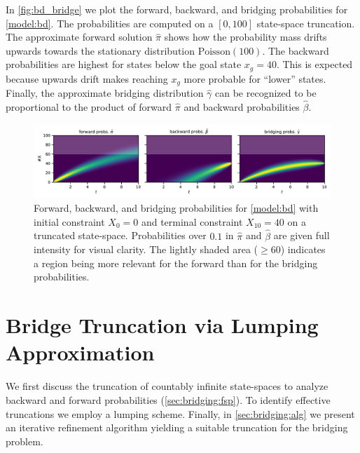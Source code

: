 \begin{example}
In \autoref{fig:bd_bridge} we plot the forward, backward, and bridging probabilities for \autoref{model:bd}.
The probabilities are computed on a $[0,100]$ state-space truncation.
The approximate forward solution $\hat\pi$ shows how the probability mass drifts upwards towards the stationary distribution $\text{Poisson}(100)$. The backward probabilities are highest for states below the goal state $x_g=40$.
This is expected because upwards drift makes reaching $x_g$ more probable for ``lower'' states.
Finally, the approximate bridging distribution $\hat\gamma$ can be recognized to be proportional to the product of forward $\hat\pi$ and backward probabilities $\hat\beta$.
\begin{figure}[htb]
    \centering
    \includegraphics[width=\textwidth]{gfx/bridging_bd.pdf}
	\caption[Forward, backward, and bridging probabilities for \autoref{model:bd}]{Forward, backward, and bridging probabilities for \autoref{model:bd} with initial constraint $X_0=0$ and terminal constraint $X_{10}=40$ on a truncated state-space. Probabilities over $0.1$ in $\hat\pi$ and $\hat\beta$ are given full intensity for visual clarity. %
    The lightly shaded area ($\geq 60$) indicates a region being more relevant for the forward than for the bridging probabilities.}
    \label{fig:bd_bridge}
\end{figure}
\end{example}

\section{Bridge Truncation via Lumping Approximation}\label{sec:bridging:method}
We first discuss the truncation of countably infinite state-spaces
to analyze backward and forward probabilities (\autoref{sec:bridging:fsp}).
To identify effective truncations we employ a lumping scheme.
Finally, in \autoref{sec:bridging:alg} we present an iterative refinement algorithm
yielding a suitable truncation for the bridging problem.

